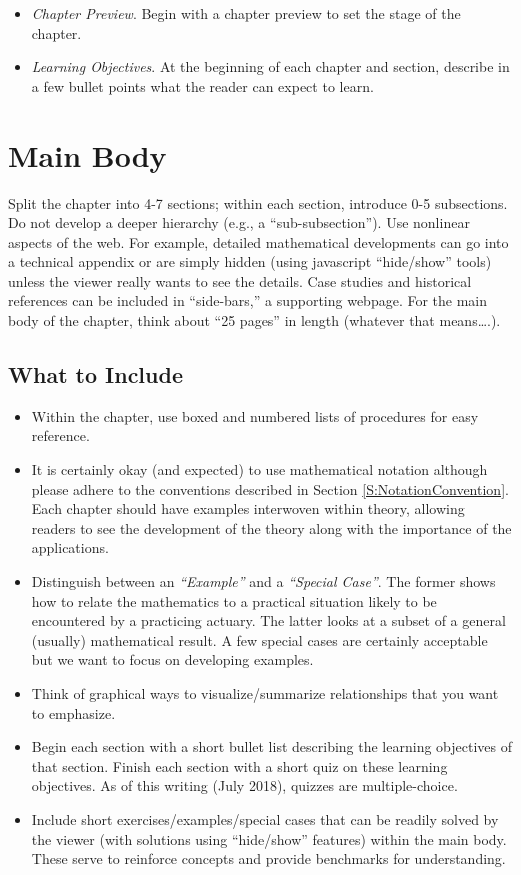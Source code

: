 \documentclass[
]{book}
\begin{document}
\begin{itemize}
\item
  \emph{Chapter Preview}. Begin with a chapter preview to set the stage of the chapter.
\item
  \emph{Learning Objectives}. At the beginning of each chapter and section, describe in a few bullet points what the reader can expect to learn.
\end{itemize}

\hypertarget{main-body}{%
\section{Main Body}\label{main-body}}

Split the chapter into 4-7 sections; within each section, introduce 0-5 subsections. Do not develop a deeper hierarchy (e.g., a ``sub-subsection''). Use nonlinear aspects of the web. For example, detailed mathematical developments can go into a technical appendix or are simply hidden (using javascript ``hide/show'' tools) unless the viewer really wants to see the details. Case studies and historical references can be included in ``side-bars,'' a supporting webpage. For the main body of the chapter, think about ``25 pages'' in length (whatever that means\ldots.).

\hypertarget{what-to-include}{%
\subsection{What to Include}\label{what-to-include}}

\begin{itemize}
\item
  Within the chapter, use boxed and numbered lists of procedures for easy reference.
\item
  It is certainly okay (and expected) to use mathematical notation although please adhere to the conventions described in Section \ref{S:NotationConvention}. Each chapter should have examples interwoven within theory, allowing readers to see the development of the theory along with the importance of the applications.
\item
  Distinguish between an \emph{``Example''} and a \emph{``Special Case''}. The former shows how to relate the mathematics to a practical situation likely to be encountered by a practicing actuary. The latter looks at a subset of a general (usually) mathematical result. A few special cases are certainly acceptable but we want to focus on developing examples.
\item
  Think of graphical ways to visualize/summarize relationships that you want to emphasize.
\item
  Begin each section with a short bullet list describing the learning objectives of that section. Finish each section with a short quiz on these learning objectives. As of this writing (July 2018), quizzes are multiple-choice.
\item
  Include short exercises/examples/special cases that can be readily solved by the viewer (with solutions using ``hide/show'' features) within the main body. These serve to reinforce concepts and provide benchmarks for understanding.
\end{itemize}
\end{document}
